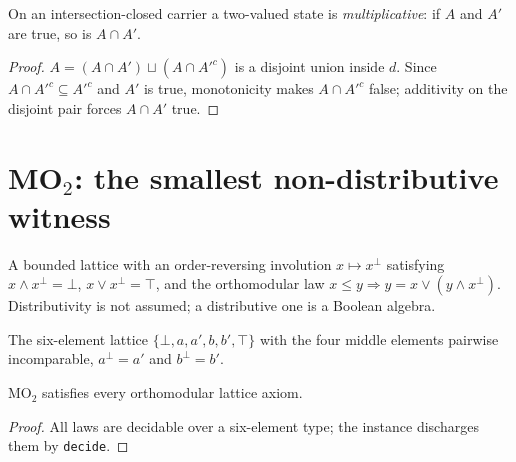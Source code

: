 \begin{lemma}
  \label{lem:val-inter}
  \leanok
  On an intersection-closed carrier a two-valued state is \emph{multiplicative}:
  if $A$ and $A'$ are true, so is $A \cap A'$.
\end{lemma}

\begin{proof}
  \leanok
  $A = (A \cap A') \sqcup (A \cap A'^{c})$ is a disjoint union inside $d$. Since
  $A \cap A'^{c} \subseteq A'^{c}$ and $A'$ is true, monotonicity makes
  $A \cap A'^{c}$ false; additivity on the disjoint pair forces $A \cap A'$ true.
\end{proof}

\section{MO$_2$: the smallest non-distributive witness}

\begin{definition}
  \label{def:oml}
  \leanok
  A bounded lattice with an order-reversing involution $x \mapsto x^{\perp}$
  satisfying $x \wedge x^{\perp} = \bot$, $x \vee x^{\perp} = \top$, and the
  orthomodular law $x \le y \Rightarrow y = x \vee (y \wedge x^{\perp})$.
  Distributivity is not assumed; a distributive one is a Boolean algebra.
\end{definition}

\begin{definition}[MO$_2$]
  \label{def:mo2}
  \leanok
  The six-element lattice $\{\bot, a, a', b, b', \top\}$ with the four middle
  elements pairwise incomparable, $a^{\perp} = a'$ and $b^{\perp} = b'$.
\end{definition}

\begin{theorem}
  \label{thm:mo2-oml}
  \leanok
  MO$_2$ satisfies every orthomodular lattice axiom.
\end{theorem}

\begin{proof}
  \leanok
  All laws are decidable over a six-element type; the instance discharges them
  by \texttt{decide}.
\end{proof}

